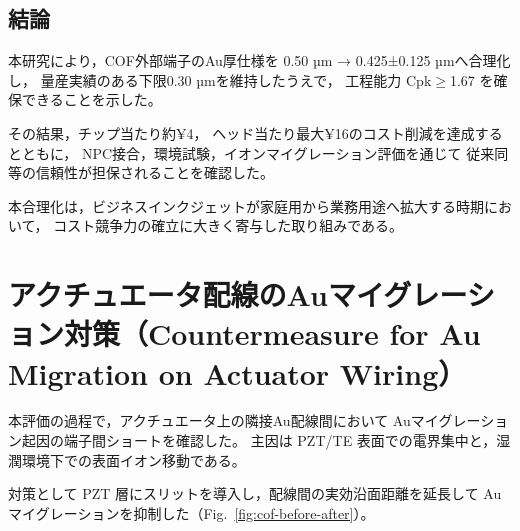 \documentclass[conference]{IEEEtran}
\begin{document}
\subsection{結論}
本研究により，COF外部端子のAu厚仕様を
0.50 µm → 0.425±0.125 µmへ合理化し，
量産実績のある下限0.30 µmを維持したうえで，
工程能力 Cpk$\geq$1.67 を確保できることを示した。  

その結果，チップ当たり約¥4，
ヘッド当たり最大¥16のコスト削減を達成するとともに，
NPC接合，環境試験，イオンマイグレーション評価を通じて
従来同等の信頼性が担保されることを確認した。  

本合理化は，ビジネスインクジェットが家庭用から業務用途へ拡大する時期において，
コスト競争力の確立に大きく寄与した取り組みである。

\appendices
\section{アクチュエータ配線のAuマイグレーション対策（Countermeasure for Au Migration on Actuator Wiring）}

本評価の過程で，アクチュエータ上の隣接Au配線間において
Auマイグレーション起因の端子間ショートを確認した。
主因は PZT/TE 表面での電界集中と，湿潤環境下での表面イオン移動である。

対策として PZT 層にスリットを導入し，配線間の実効沿面距離を延長して
Auマイグレーションを抑制した（Fig.~\ref{fig:cof-before-after}）。
\end{document}
